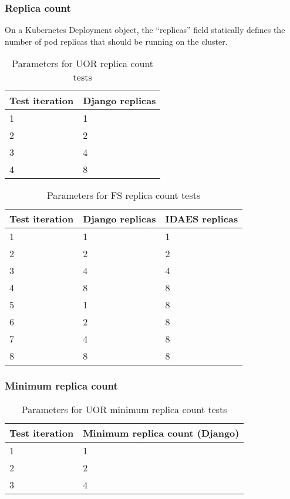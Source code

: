 \subsubsection{Replica count}

On a Kubernetes Deployment object, the ``replicas'' field statically defines the number of pod replicas that should be running on the cluster.

\begin{table}[h]
    \centering
    \begin{tabularx}{\textwidth}{|X|X|}
        \hline
        \textbf{Test iteration} & \textbf{Django replicas}  \\ \hline
        1 & 1 \\ \hline
        2 & 2 \\ \hline
        3 & 4 \\ \hline
        4 & 8 \\ \hline
    \end{tabularx}
    \caption{Parameters for UOR replica count tests}
    \label{table:test-replica-count-uor}
\end{table}

\begin{table}[h]
    \centering
    \begin{tabularx}{\textwidth}{|X|X|X|}
        \hline
        \textbf{Test iteration} & \textbf{Django replicas} & \textbf{IDAES replicas}  \\ \hline
        1 & 1 & 1 \\ \hline
        2 & 2 & 2 \\ \hline
        3 & 4 & 4 \\ \hline
        4 & 8 & 8 \\ \hline
        5 & 1 & 8 \\ \hline
        6 & 2 & 8 \\ \hline
        7 & 4 & 8 \\ \hline
        8 & 8 & 8 \\ \hline
    \end{tabularx}
    \caption{Parameters for FS replica count tests}
    \label{table:test-replica-count-fs}
\end{table}

\subsubsection{Minimum replica count}

\begin{table}[h]
    \centering
    \begin{tabularx}{\textwidth}{|X|X|}
        \hline
        \textbf{Test iteration} & \textbf{Minimum replica count (Django)}  \\ \hline
        1 & 1 \\ \hline
        2 & 2 \\ \hline
        3 & 4 \\ \hline
    \end{tabularx}
    \caption{Parameters for UOR minimum replica count tests}
    \label{table:test-min-replica-count-uor}
\end{table}

